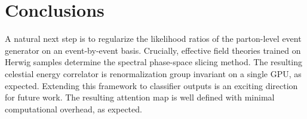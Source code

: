 \section{Conclusions}\label{sec:conclusions}

A natural next step is to regularize the likelihood ratios of the
parton-level event generator on an event-by-event basis. Crucially,
effective field theories trained on Herwig samples determine the
spectral phase-space slicing method. The resulting celestial energy
correlator is renormalization group invariant on a single GPU, as
expected. Extending this framework to classifier outputs is an exciting
direction for future work. The resulting attention map is well defined
with minimal computational overhead, as expected.

